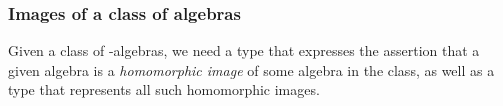 \subsubsection{Images of a class of algebras}\label{images-of-a-class-of-algebras}

Given a class  of -algebras, we need a type that expresses the assertion that a given algebra is a \emph{homomorphic image} of some algebra in the class, as well as a type that represents all such homomorphic images.
\ccpad
\begin{code}%
\>[1]\AgdaSpace{}%
\AgdaSymbol{:}\AgdaSpace{}%
\AgdaSpace{}%
\AgdaSpace{}%
\AgdaSpace{}%
\AgdaSpace{}%
\AgdaSpace{}%
\AgdaSymbol{(}\AgdaSpace{}%
\AgdaSpace{}%
\AgdaSymbol{)(}\AgdaSpace{}%
\AgdaSymbol{)}\AgdaSpace{}%
\AgdaSpace{}%
\AgdaSpace{}%
\AgdaSpace{}%
\<%
\\
%
\>[1]\AgdaSpace{}%
\AgdaSpace{}%
\AgdaSpace{}%
\AgdaSymbol{=}\AgdaSpace{}%
\AgdaSpace{}%
\AgdaSpace{}%
\AgdaSpace{}%
\AgdaSymbol{(}\AgdaSpace{}%
\AgdaSpace{}%
\AgdaSymbol{)}\AgdaSpace{}%
\AgdaFunction{,}\AgdaSpace{}%
\AgdaSymbol{(}\AgdaSpace{}%
\AgdaSpace{}%
\AgdaSymbol{)}\AgdaSpace{}%
\AgdaSpace{}%
\AgdaSymbol{(}\AgdaSpace{}%
\AgdaSpace{}%
\AgdaSymbol{)}\<%
\\
%
\\[\AgdaEmptyExtraSkip]%
%
\>[1]\AgdaSpace{}%
\AgdaSymbol{:}\AgdaSpace{}%
\AgdaSpace{}%
\AgdaSymbol{(}\AgdaSpace{}%
\AgdaSpace{}%
\AgdaSymbol{)}\AgdaSpace{}%
\AgdaSymbol{(}\AgdaSpace{}%
\AgdaSymbol{)}\AgdaSpace{}%
\AgdaSpace{}%
\AgdaSpace{}%
\AgdaSpace{}%
\<%
\\
%
\>[1]\AgdaSpace{}%
\AgdaSpace{}%
\AgdaSymbol{=}\AgdaSpace{}%
\AgdaSpace{}%
\AgdaSpace{}%
\AgdaSpace{}%
\AgdaSymbol{(}\AgdaSpace{}%
\AgdaSpace{}%
\AgdaSymbol{)}\AgdaSpace{}%
\AgdaFunction{,}\AgdaSpace{}%
\AgdaSymbol{(}\AgdaSpace{}%
\AgdaSpace{}%
\AgdaSymbol{)}\<%
\end{code}
\ccpad
